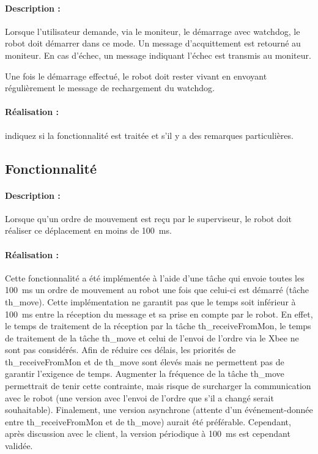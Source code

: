 \documentclass[11pt, a4paper]{paper}
\newcounter{cptreq}
\begin{document}
\paragraph{Description :} Lorsque l'utilisateur demande, via le moniteur, le démarrage avec watchdog, le robot doit démarrer dans ce mode. Un message d'acquittement est retourné au moniteur. En cas d'échec, un message indiquant l'échec est transmis au moniteur.

Une fois le démarrage effectué, le robot doit rester vivant en envoyant régulièrement le message de rechargement du watchdog.

\paragraph{\color{black}Réalisation :}  {\color{red} indiquez si la fonctionnalité est traitée et s'il y a des remarques particulières.}

{\color{gray}
\subsection{Fonctionnalité \thecptreq *}

\paragraph{Description :} Lorsque qu'un ordre de mouvement est reçu par le superviseur, le robot doit réaliser ce déplacement en moins de 100~ms.

\paragraph{\color{black}Réalisation :}  {\color{blue} Cette fonctionnalité a été implémentée à l'aide d'une tâche qui envoie toutes les 100~ms un ordre de mouvement au robot une fois que celui-ci est démarré (tâche th\_move). Cette implémentation ne garantit pas que le temps soit inférieur à 100~ms entre la réception du message et sa prise en compte par le robot. En effet, le temps de traitement de la réception par la tâche th\_receiveFromMon, le temps de traitement de la tâche th\_move et celui de l'envoi de l'ordre via le Xbee ne sont pas considérés. Afin de réduire ces délais, les priorités de  th\_receiveFromMon et de th\_move sont élevés mais ne permettent pas de garantir l'exigence de temps. Augmenter la fréquence de la tâche th\_move permettrait de tenir cette contrainte, mais risque de surcharger la communication avec le robot (une version avec l'envoi de l'ordre que s'il a changé serait souhaitable). Finalement, une version asynchrone (attente d'un événement-donnée entre th\_receiveFromMon et de th\_move) aurait été préférable. Cependant, après discussion avec le client, la version périodique à 100~ms est cependant validée.}
}
\end{document}
